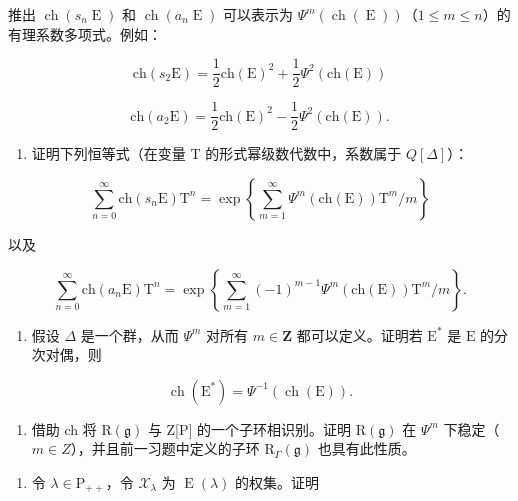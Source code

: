 推出 \(\operatorname{ch}(s_{n}\operatorname{E})\) 和 \(\operatorname{ch}(a_{n}\operatorname{E})\) 可以表示为 \(\varPsi^{m}(\operatorname{ch}(\operatorname{E}))\)（\(1 \leq m \leq n\)）的有理系数多项式。例如：

\[
\mathrm{ch} (s _ {2} \mathrm{E}) = \frac {1}{2} \mathrm{ch} (\mathrm{E}) ^ {2} + \frac {1}{2} \varPsi^ {2} (\mathrm{ch} (\mathrm{E}))
\]

\[
\mathrm{ch} (a _ {2} \mathrm{E}) = \frac {1}{2} \mathrm{ch} (\mathrm{E}) ^ {2} - \frac {1}{2} \varPsi^ {2} (\mathrm{ch} (\mathrm{E})).
\]

\begin{enumerate}
\def\labelenumi{\alph{enumi})}
\setcounter{enumi}{1}
\tightlist
\item
  证明下列恒等式（在变量 T 的形式幂级数代数中，系数属于 \(Q[\Delta]\)）：
\end{enumerate}

\[
\sum_ {n = 0} ^ {\infty} \mathrm{ch} (s _ {n} \mathrm{E}) \mathrm{T} ^ {n} = \exp \left\{\sum_ {m = 1} ^ {\infty} \varPsi^ {m} (\mathrm{ch(E)}) \mathrm{T} ^ {m} / m \right\}
\]

以及

\[
\sum_ {n = 0} ^ {\infty} \mathrm{ch} (a _ {n} \mathrm{E}) \mathrm{T} ^ {n} = \exp \left\{\sum_ {m = 1} ^ {\infty} (- 1) ^ {m - 1} \varPsi^ {m} (\mathrm{ch(E)}) \mathrm{T} ^ {m} / m \right\}.
\]

\begin{enumerate}
\def\labelenumi{\alph{enumi})}
\setcounter{enumi}{2}
\tightlist
\item
  假设 \(\Delta\) 是一个群，从而 \(\varPsi^{m}\) 对所有 \(m\in \mathbf{Z}\) 都可以定义。证明若 \(\mathrm{E}^*\) 是 \(\mathrm{E}\) 的分次对偶，则
\end{enumerate}

\[
\operatorname{ch} \left(\mathrm{E} ^ {*}\right) = \Psi^ {- 1} (\operatorname{ch} (\mathrm{E})).
\]

\begin{enumerate}
\def\labelenumi{\alph{enumi})}
\setcounter{enumi}{3}
\tightlist
\item
  借助 ch 将 \(\mathrm{R}(\mathfrak{g})\) 与 Z[P] 的一个子环相识别。证明 \(\mathrm{R}(\mathfrak{g})\) 在 \(\varPsi^{m}\) 下稳定（\(m \in Z\)），并且前一习题中定义的子环 \(\mathrm{R}_{\varGamma}(\mathfrak{g})\) 也具有此性质。
\end{enumerate}

\begin{enumerate}
\def\labelenumi{\arabic{enumi})}
\setcounter{enumi}{11}
\tightlist
\item
  令 \(\lambda \in \mathrm{P}_{++}\)，令 \(\mathcal{X}_{\lambda}\) 为 \(\operatorname{E}(\lambda)\) 的权集。证明
\end{enumerate}

